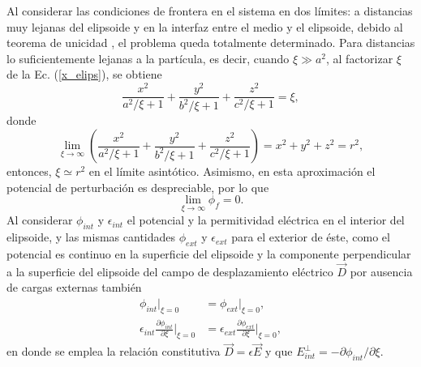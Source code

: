 Al considerar las condiciones de frontera en el sistema en dos límites: a distancias muy lejanas del elipsoide y en la interfaz entre el medio y el elipsoide, debido al teorema de unicidad \cite{Griffiths}, el problema queda totalmente determinado. Para distancias lo suficientemente lejanas a la partícula, es decir, cuando $\xi\gg a^2$, al factorizar $\xi$ de  la Ec. (\ref{x_elips}), se obtiene
\begin{equation*}
    \frac{x^2}{a^2/\xi+1}+\frac{y^2}{b^2/\xi+1}+\frac{z^2}{c^2/\xi+1}=\xi,
\end{equation*}
donde
\begin{equation*}
    \lim_{\xi\rightarrow\infty}\left(\frac{x^2}{a^2/\xi+1}+\frac{y^2}{b^2/\xi+1}+\frac{z^2}{c^2/\xi+1}\right)=x^2+y^2+z^2=r^2,
\end{equation*}
entonces, $\xi \simeq r^2$ en el límite asintótico. Asimismo, en esta aproximación el potencial de perturbación es despreciable, por lo que 
\begin{equation}
\lim_{\xi\rightarrow\infty}\phi_f=0
\label{limitephi_p}.
\end{equation}
Al considerar $\phi_{int}$ y $\epsilon_{int}$ el potencial y la permitividad eléctrica en el interior del elipsoide, y las mismas cantidades $\phi_{ext}$ y $\epsilon_{ext}$ para el exterior de éste, como el potencial es continuo en la superficie del elipsoide y la componente perpendicular a la superficie del elipsoide del campo de desplazamiento eléctrico $\Vec{D}$ por ausencia de cargas externas también \cite{Griffiths}
\begin{subequations}
\label{condicionesfrontera}
\begin{align}
    \phi_{int}|_{\xi=0}&=\phi_{ext}|_{\xi=0}\label{cf1},\\
    \epsilon_{int}\frac{\partial \phi_{int}}{\partial \xi}\Big |_{\xi=0}&=
    \epsilon_{ext}\frac{\partial \phi_{ext}}{\partial \xi}\Big |_{\xi=0}\label{cf2},
\end{align}
\end{subequations}
en donde se emplea la relación constitutiva $\Vec{D}=\epsilon\Vec{E}$ y que $E_{int}^{\perp}=-\partial \phi_{int} /\partial \xi$.\\


